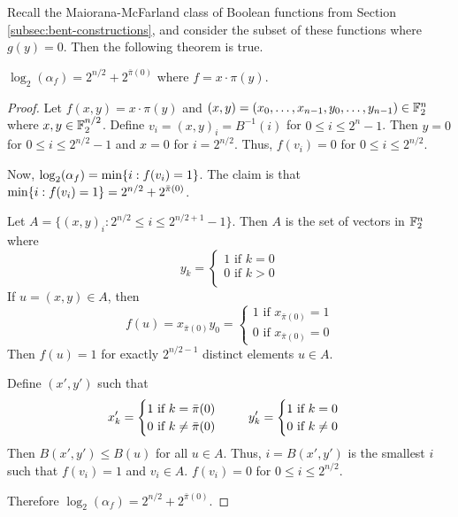 \par Recall the Maiorana-McFarland class of Boolean functions from Section
\ref{subsec:bent-constructions}, and consider
the subset of these functions where $g(y)=0$. Then the following theorem is
true.

\begin{theorem}
  $\log_2(\alpha_f)=2^{n/2}+2^{\bar{\pi}(0)} $ where
  $f=x\cdot\pi(y)$.
\end{theorem}
\begin{proof}
  \par Let $f(x,y)=x\cdot\pi(y)$ and
  $(x,y)=(x_0,\dots,x_{n-1},y_0,\dots,y_{n-1})\in\mathbb{F}_2^n$ where
  $x,y\in\mathbb{F}_2^{n/2}$. Define $v_i=(x,y)_i=B^{-1}(i)$ for $0\leq i\leq
  2^{n}-1$. Then $y=0$ for $0\leq i\leq2^{n/2}-1$ and $x=0$ for $i=2^{n/2}$.
  Thus, $f(v_i)=0$ for $0\leq i \leq 2^{n/2}$.
  \par Now, $\log_2(\alpha_f)={\rm min}\{i:f(v_i)=1\}$. The claim is that
  ${\rm min}\{i:f(v_i)=1\}=2^{n/2}+2^{\bar{\pi}(0)}$.
  \par Let $A=\{(x,y)_i:2^{n/2}\leq i\leq 2^{n/2+1}-1\}$. Then $A$ is the set of
  vectors in $\mathbb{F}_2^n$ where
  \[
    y_k=
    \begin{cases}
      1 \text{ if } k=0\\
      0 \text{ if } k>0\\
    \end{cases}
  \]
  If $u=(x,y)\in A$, then
  \[
    f(u)=x_{\bar{\pi}(0)}y_0=
    \begin{cases}
      1 \text{ if } x_{\bar{\pi}(0)}=1\\
      0 \text{ if } x_{\bar{\pi}(0)}=0
    \end{cases}
  \]
  Then $f(u)=1$ for exactly $2^{n/2-1}$ distinct elements $u\in A$.
  \par Define $(x',y')$ such that
  \[
    x_k'=
    \begin{cases}
      1 \text{ if } k=\bar{\pi}(0)\\
      0 \text{ if } k\not=\bar{\pi}(0)
    \end{cases}
    \hspace{5mm}
    y_k'=
    \begin{cases}
      1 \text{ if } k=0\\
      0 \text{ if } k\not=0
    \end{cases}
  \]
  Then $B(x',y')\leq B(u)$ for all $u\in A$. Thus, $i=B(x',y')$ is the smallest
  $i$ such that $f(v_i)=1$ and $v_i\in A$. $f(v_i)=0$ for $0\leq i\leq 2^{n/2}$.
  \par Therefore $\log_2(\alpha_f)=2^{n/2}+2^{\bar{\pi}(0)}$.
\end{proof}
